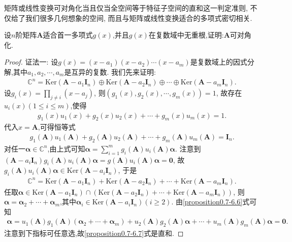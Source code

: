 \documentclass[../../main.tex]{subfiles}
\begin{document}
矩阵或线性变换可对角化当且仅当全空间等于特征子空间的直和这一判定准则, 不仅给了我们很多几何想象的空间, 而且与矩阵或线性变换适合的多项式密切相关.

\begin{proposition}\label{proposition:适合的多项式无重根则可对角化}
设\(n\)阶矩阵\(\boldsymbol{A}\)适合首一多项式\(g(x)\),并且\(g(x)\)在复数域中无重根,证明:\(\boldsymbol{A}\)可对角化.
\end{proposition}
\begin{proof}
{\color{blue}证法一:}
设\(g(x) = (x - a_1)(x - a_2)\cdots(x - a_m)\)是复数域上的因式分解,其中\(a_1,a_2,\cdots,a_m\)是互异的复数. 我们先来证明:
\begin{align}
\mathbb{C}^n = \mathrm{Ker}(\boldsymbol{A} - a_1\boldsymbol{I}_n)\oplus \mathrm{Ker}(\boldsymbol{A} - a_2\boldsymbol{I}_n)\oplus\cdots\oplus \mathrm{Ker}(\boldsymbol{A} - a_m\boldsymbol{I}_n). \label{proposition0.7-6.5}
\end{align}
设\(g_i(x) = \prod_{j\neq i}(x - a_j)\), 则\((g_1(x),g_2(x),\cdots,g_m(x)) = 1\), 故存在\(u_i(x)(1\leq i\leq m)\),使得
\begin{align*}
g_1(x)u_1(x) + g_2(x)u_2(x) + \cdots + g_m(x)u_m(x) = 1.
\end{align*}
代入\(x = \boldsymbol{A}\),可得恒等式
\begin{align}
g_1(\boldsymbol{A})u_1(\boldsymbol{A}) + g_2(\boldsymbol{A})u_2(\boldsymbol{A}) + \cdots + g_m(\boldsymbol{A})u_m(\boldsymbol{A}) = \boldsymbol{I}_n. \label{proposition0.7-6.6}
\end{align}
对任一\(\boldsymbol{\alpha}\in \mathbb{C}^n\),由上式可知\(\boldsymbol{\alpha} = \sum_{i = 1}^{m}g_i(\boldsymbol{A})u_i(\boldsymbol{A})\boldsymbol{\alpha}\). 注意到\((\boldsymbol{A}-a_i\boldsymbol{I}_n)g_i(\boldsymbol{A})u_i(\boldsymbol{A})\boldsymbol{\alpha} = g(\boldsymbol{A})u_i(\boldsymbol{A})\boldsymbol{\alpha} = \boldsymbol{0}\), 故\(g_i(\boldsymbol{A})u_i(\boldsymbol{A})\boldsymbol{\alpha}\in \mathrm{Ker}(\boldsymbol{A} - a_i\boldsymbol{I}_n)\), 于是
\begin{align}
\mathbb{C}^n = \mathrm{Ker}(\boldsymbol{A} - a_1\boldsymbol{I}_n) + \mathrm{Ker}(\boldsymbol{A} - a_2\boldsymbol{I}_n) + \cdots + \mathrm{Ker}(\boldsymbol{A} - a_m\boldsymbol{I}_n). \label{proposition0.7-6.7}
\end{align}
任取\(\boldsymbol{\alpha}\in \mathrm{Ker}(\boldsymbol{A}-a_1\boldsymbol{I}_n)\cap(\mathrm{Ker}(\boldsymbol{A}-a_2\boldsymbol{I}_n)+\cdots+\mathrm{Ker}(\boldsymbol{A}-a_m\boldsymbol{I}_n))\), 则\(\boldsymbol{\alpha} = \boldsymbol{\alpha}_2+\cdots+\boldsymbol{\alpha}_m\),其中\(\boldsymbol{\alpha}_i\in \mathrm{Ker}(\boldsymbol{A} - a_i\boldsymbol{I}_n)(i\geq 2)\). 由\eqref{proposition0.7-6.6}式可知
\begin{align*}
\boldsymbol{\alpha} = u_1(\boldsymbol{A})g_1(\boldsymbol{A})(\boldsymbol{\alpha}_2 + \cdots + \boldsymbol{\alpha}_m) + u_2(\boldsymbol{A})g_2(\boldsymbol{A})\boldsymbol{\alpha} + \cdots + u_m(\boldsymbol{A})g_m(\boldsymbol{A})\boldsymbol{\alpha} = \boldsymbol{0}.
\end{align*}
注意到下指标可任意选,故\eqref{proposition0.7-6.7}式是直和.


\end{proof}
\end{document}
